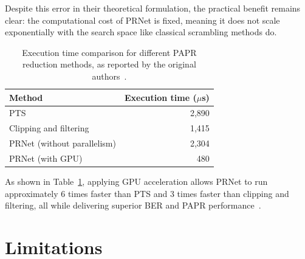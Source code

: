 Despite this error in their theoretical formulation, the practical benefit remains clear: the computational cost of PRNet is fixed, meaning it does not scale exponentially with the search space like classical scrambling methods do.

\begin{table}[H]
    \centering
    \caption{Execution time comparison for different PAPR reduction methods, as reported by the original authors~\cite{kim2017novel}.}
    \label{tab:prnet_timing}
    \begin{tabular}{@{} l r @{}}
        \toprule
        \textbf{Method}             & \textbf{Execution time ($\mu$s)} \\
        \midrule
        PTS                         & 2{,}890                          \\
        Clipping and filtering      & 1{,}415                          \\
        PRNet (without parallelism) & 2{,}304                          \\
        PRNet (with GPU)            & 480                              \\
        \bottomrule
    \end{tabular}
\end{table}

As shown in Table~\ref{tab:prnet_timing}, applying GPU acceleration allows PRNet to run approximately 6 times faster than PTS and 3 times faster than clipping and filtering, all while delivering superior BER and PAPR performance~\cite{kim2017novel}.

\section{Limitations}
\label{sec:limitations}

